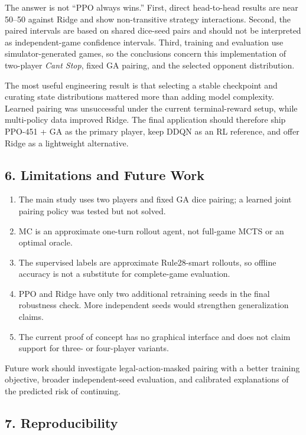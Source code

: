 \documentclass[
  11pt,
]{article}
\providecommand{\tightlist}{%
  \setlength{\itemsep}{0pt}\setlength{\parskip}{0pt}}
\begin{document}
The answer is not ``PPO always wins.'' First, direct head-to-head
results are near 50--50 against Ridge and show non-transitive strategy
interactions. Second, the paired intervals are based on shared dice-seed
pairs and should not be interpreted as independent-game confidence
intervals. Third, training and evaluation use simulator-generated games,
so the conclusions concern this implementation of two-player
\emph{Can\textquotesingle t Stop}, fixed GA pairing, and the selected
opponent distribution.

The most useful engineering result is that selecting a stable checkpoint
and curating state distributions mattered more than adding model
complexity. Learned pairing was unsuccessful under the current
terminal-reward setup, while multi-policy data improved Ridge. The final
application should therefore ship PPO-451 + GA as the primary player,
keep DDQN as an RL reference, and offer Ridge as a lightweight
alternative.

\subsection{6. Limitations and Future
Work}\label{6-limitations-and-future-work}

\begin{enumerate}
\def\labelenumi{\arabic{enumi}.}
\tightlist
\item
  The main study uses two players and fixed GA dice pairing; a learned
  joint pairing policy was tested but not solved.
\item
  MC is an approximate one-turn rollout agent, not full-game MCTS or an
  optimal oracle.
\item
  The supervised labels are approximate Rule28-smart rollouts, so
  offline accuracy is not a substitute for complete-game evaluation.
\item
  PPO and Ridge have only two additional retraining seeds in the final
  robustness check. More independent seeds would strengthen
  generalization claims.
\item
  The current proof of concept has no graphical interface and does not
  claim support for three- or four-player variants.
\end{enumerate}

Future work should investigate legal-action-masked pairing with a better
training objective, broader independent-seed evaluation, and calibrated
explanations of the predicted risk of continuing.

\subsection{7. Reproducibility}\label{7-reproducibility}
\end{document}
